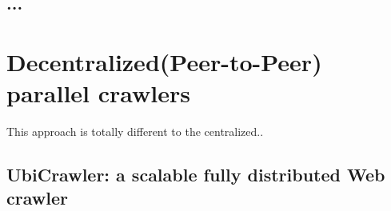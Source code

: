 \subsection{...}


\section{Decentralized(Peer-to-Peer) parallel crawlers}

This approach is totally different to the centralized..

\subsection{UbiCrawler: a scalable fully distributed Web crawler}

